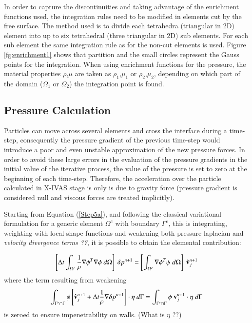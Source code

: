 In order to capture the discontinuities and taking advantage of the enrichment functions used, the integration rules need to be modified in elements cut by the free surface. The method used is to divide each tetrahedra (triangular in 2D) element into up to six tetrahedral
(three triangular in 2D) sub elements. For each sub element the same integration rule as for the non-cut elements is used. Figure \ref{fg:enrichment1} shows that partition and the small circles represent the Gauss points for the integration. When using enrichment functions for the pressure, the material properties $\rho$,$\mu$ are taken as $\rho_1$,$\mu_1$ or $\rho_2$,$\mu_2$, depending on which part of the domain ($\Omega_1$ or $\Omega_2$) the integration point is found.

   \subsection{Pressure Calculation}

Particles can move across several elements and cross the interface during a time-step, consequently the pressure gradient of the previous time-step would introduce a poor and even unstable approximation of the new pressure forces. In order to avoid these large errors in the evaluation of the pressure gradients in the initial value of the iterative process, the value of the pressure is set to zero at the beginning of each time-step. Therefore, the acceleration over the particle calculated in X-IVAS stage is only is due to gravity force (pressure gradient is considered null and viscous forces are treated implicitly)\cite{Idelsohn13c}.

Starting from Equation (\ref{Step5a}), and following the classical variational formulation for a generic element $\Omega^e$ with boundary $\Gamma^e$, this is integrating, weighting with local shape functions and weakening both pressure laplacian and \emph{velocity divergence terms ??}, it is possible to obtain the elemental contribution:

\begin{equation}
   \left[\Delta t \int_{\Omega^e} \frac{1}{\rho} \nabla \phi^T \nabla \phi \ d\Omega\right]\ \delta p^{n+1} = \left[\int_{\Omega^e} \nabla \phi^T \psi \ d\Omega\right]\ \hat \vv_j^{n+1}
\label{poisson}
\end{equation}
where the term resulting from weakening
\begin{equation}
\displaystyle \int_{\Gamma^e\cap\Gamma} \phi \left[ \hat \vv_j^{n+1} + \Delta t \frac{1}{\rho} \nabla  \delta p^{n+1} \right] \cdot \eta \ d\Gamma = \int_{\Gamma^e\cap\Gamma} \phi \ \vv_j^{n+1} \cdot \eta \ d\Gamma
\end{equation}
 is zeroed to ensure impenetrability on walls.  (What is $\eta$ ??)

